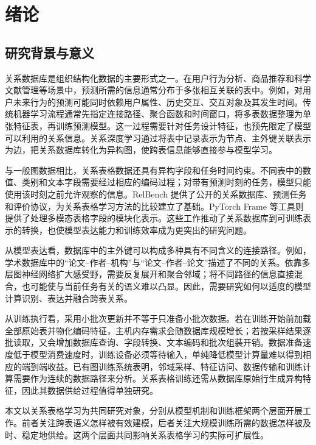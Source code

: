 \chapter{绪论}
\label{chap:introduction}

\section{研究背景与意义}

关系数据库是组织结构化数据的主要形式之一。在用户行为分析、商品推荐和科学文献管理等场景中，预测所需的信息通常分布于多张相互关联的表中。例如，对用户未来行为的预测可能同时依赖用户属性、历史交互、交互对象及其发生时间。传统机器学习流程通常先指定连接路径、聚合函数和时间窗口，将多表数据整理为单张特征表，再训练预测模型。这一过程需要针对任务设计特征，也预先限定了模型可以利用的关系信息。关系深度学习通过将表中记录表示为节点、主外键关联表示为边，把关系数据库转化为异构图，使跨表信息能够直接参与模型学习\cite{fey2024rdl}。

与一般图数据相比，关系表格数据还具有异构字段和任务时间约束。不同表中的数值、类别和文本字段需要经过相应的编码过程；对带有预测时刻的任务，模型只能使用该时刻之前允许观察的信息。RelBench 提供了公开的关系数据库、预测任务和评价协议，为关系表格学习方法的比较建立了基础\cite{robinson2024relbench}。PyTorch Frame 等工具则提供了处理多模态表格字段的模块化表示\cite{hu2024pytorchframe}。这些工作推动了关系数据库到可训练表示的转换，也使模型表达能力和训练效率成为更突出的研究问题。

从模型表达看，数据库中的主外键可以构成多种具有不同含义的连接路径。例如，学术数据库中的“论文--作者--机构”与“论文--作者--论文”描述了不同的关系。依靠多层图神经网络扩大感受野，需要反复展开和聚合邻域；将不同路径的信息直接混合，也可能使与当前任务有关的语义难以凸显。因此，需要研究如何以适度的模型计算识别、表达并融合跨表关系。

从训练执行看，采用小批次更新并不等于只准备小批次数据。若在训练开始前加载全部原始表并物化编码特征，主机内存需求会随数据库规模增长；若按采样结果逐批读取，又会增加数据库查询、字段转换、文本编码和批次组装开销。数据准备速度低于模型消费速度时，训练设备必须等待输入，单纯降低模型计算量难以得到相应的端到端收益。已有图训练系统表明，邻域采样、特征访问、数据传输和训练计算需要作为连续的数据路径来分析\cite{kaler2022salient,liu2023bgl}。关系表格训练还需从数据库原始行生成异构特征，因此其数据供给过程值得单独研究。

本文以关系表格学习为共同研究对象，分别从模型机制和训练框架两个层面开展工作。前者关注跨表语义怎样被有效建模，后者关注大规模训练所需的数据怎样被及时、稳定地供给。这两个层面共同影响关系表格学习的实际可扩展性。

